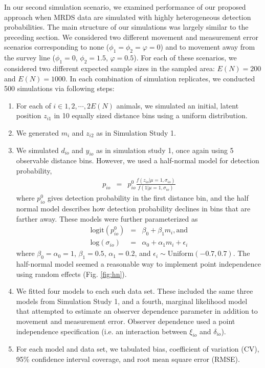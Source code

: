 \documentclass[aoas,preprint]{imsart}
\numberwithin{equation}{section}
\theoremstyle{plain}
\begin{document}
In our second simulation scenario, we examined performance of our proposed approach when MRDS data are simulated with highly heterogeneous detection probabilities.  The main structure of our simulations was largely similar to the preceding section.  We considered two different movement and measurement error scenarios corresponding to none ($\phi_1=\phi_2=\varphi=0$) and to movement away from the survey line ($\phi_1=0$, $\phi_2=1.5$, $\varphi=0.5$). For each of these scenarios, we considered two different expected sample sizes in the sampled area: $E(N) = 200$ and $E(N)=1000$.  In each combination of simulation replicates, we conducted 500 simulations via following steps:
\begin{enumerate}
  \item For each of $i \in 1,2,\cdots,2E(N)$ animals, we simulated an initial, latent position $z_{i1}$ in 10 equally sized distance bins using a uniform distribution.
  \item We generated $m_i$ and $z_{i2}$ as in Simulation Study 1.
  \item We simulated $d_{io}$ and $y_{io}$ as in simulation study 1, once again using 5 observable distance bins. However, we used a half-normal model for detection probability,
      \begin{eqnarray*}
        p_{io} & = & p_{io}^0 \frac{f(z_{io}|\mu=1,\sigma_{io})}{f(1|\mu=1,\sigma_{io})}
      \end{eqnarray*}
      where $p_{io}^0$ gives detection probability in the first distance bin, and the half normal model describes how detection probability declines in bins that are farther away. These models were further parameterized as
      \begin{eqnarray*}
        \text{logit}(p_{io}^0) & = & \beta_0 + \beta_1 m_i, \text{and} \\
        \text{log}(\sigma_{io}) & = & \alpha_0 + \alpha_1 m_i + \epsilon_i
      \end{eqnarray*}
      where $\beta_0 = \alpha_0 = 1$, $\beta_1 = 0.5$, $\alpha_1 = 0.2$, and $\epsilon_i \sim \text{Uniform}(-0.7,0.7)$.  The half-normal model seemed a reasonable way to implement point independence \citep{LaakeBorchers2004} using random effects (Fig. \ref{fig:hn}).
  \item We fitted four models to each such data set.  These included the same three models from Simulation Study 1, and a fourth, marginal likelihood model that attempted to estimate an observer dependence parameter in addition to movement and measurement error.  Observer dependence used a point independence specification (i.e. an interaction between $\xi_{io}$ and $\delta_{io}$). \\
  \item For each model and data set, we tabulated bias, coefficient of variation (CV), 95\% confidence interval coverage, and root mean square error (RMSE).
\end{enumerate}
\end{document}
